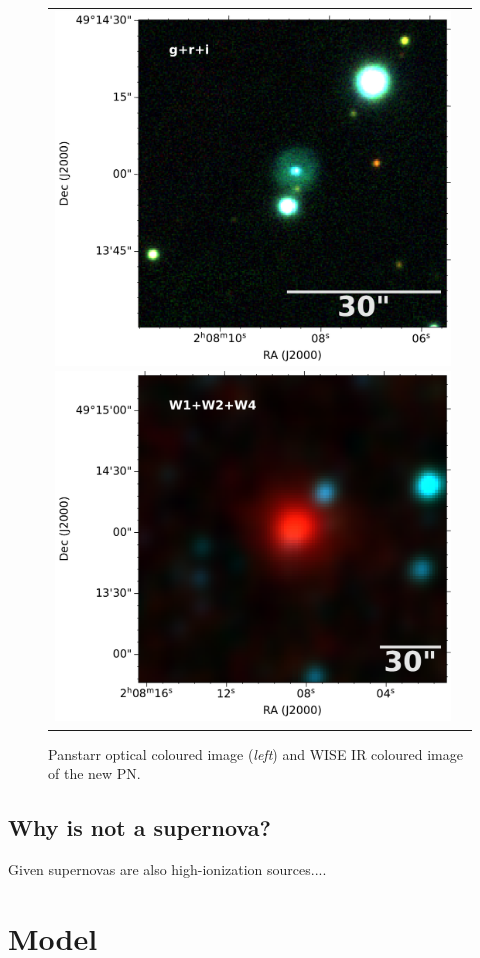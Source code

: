 \documentclass[twocolumn]{article}
\begin{document}
\begin{figure}
  \centering
  \begin{tabular}{l l}
\includegraphics[width=0.5\linewidth]{../image-panstarr/cutout_rings_v3_skycell_2294_031_stk_i_unconv-irg-RGB.pdf}
\includegraphics[width=0.5\linewidth]{../image-wise/w4_ra32_035994_dec49_233615-421-RGB.pdf}
\end{tabular}  
  \caption{Panstarr optical coloured image (\textit{left}) and WISE IR coloured image of the new PN. } 
  \label{fig:image}
\end{figure}

\subsection{Why is not a supernova?}
\label{sec:snr}

Given supernovas are also high-ionization sources....



\section{Model}
\label{sec:model}
\end{document}
